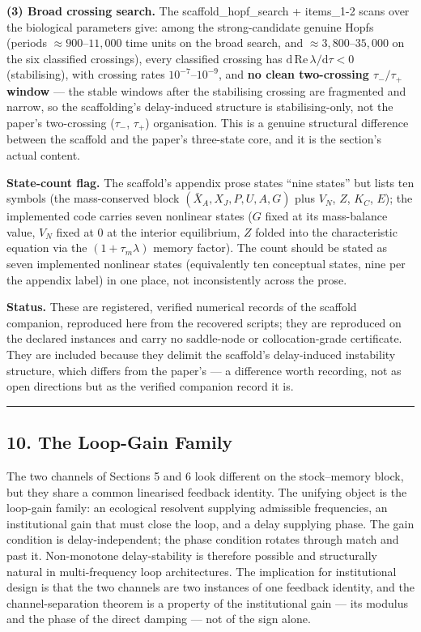 \documentclass[11pt]{article}
\begin{document}
\textbf{(3) Broad crossing search.} The scaffold\_hopf\_search +
items\_1-2 scans over the biological parameters give: among the
strong-candidate genuine Hopfs (periods \(\approx 900\)--\(11{,}000\)
time units on the broad search, and \(\approx 3{,}800\)--\(35{,}000\) on
the six classified crossings), every classified crossing has
\(\mathrm{d\,Re}\,\lambda/\mathrm{d}\tau < 0\) (stabilising), with
crossing rates \(10^{-7}\)--\(10^{-9}\), and \textbf{no clean
two-crossing \(\tau_-/\tau_+\) window} --- the stable windows after the
stabilising crossing are fragmented and narrow, so the scaffolding's
delay-induced structure is stabilising-only, not the paper's
two-crossing (\(\tau_-\), \(\tau_+\)) organisation. This is a genuine
structural difference between the scaffold and the paper's three-state
core, and it is the section's actual content.

\textbf{State-count flag.} The scaffold's appendix prose states ``nine
states'' but lists ten symbols (the mass-conserved block
\((\bar X_A, X_J, P, U, A, G)\) plus \(V_N\), \(Z\), \(K_C\), \(E\));
the implemented code carries seven nonlinear states (\(G\) fixed at its
mass-balance value, \(V_N\) fixed at \(0\) at the interior equilibrium,
\(Z\) folded into the characteristic equation via the
\((1+\tau_m\lambda)\) memory factor). The count should be stated as
seven implemented nonlinear states (equivalently ten conceptual states,
nine per the appendix label) in one place, not inconsistently across the
prose.

\textbf{Status.} These are registered, verified numerical records of the
scaffold companion, reproduced here from the recovered scripts; they are
reproduced on the declared instances and carry no saddle-node or
collocation-grade certificate. They are included because they delimit
the scaffold's delay-induced instability structure, which differs from
the paper's --- a difference worth recording, not as open directions but
as the verified companion record it is.

\begin{center}\rule{0.5\linewidth}{0.5pt}\end{center}

\subsection{10. The Loop-Gain Family}\label{the-loop-gain-family}

The two channels of Sections 5 and 6 look different on the stock--memory
block, but they share a common linearised feedback identity. The
unifying object is the loop-gain family: an ecological resolvent
supplying admissible frequencies, an institutional gain that must close
the loop, and a delay supplying phase. The gain condition is
delay-independent; the phase condition rotates through match and past
it. Non-monotone delay-stability is therefore possible and structurally
natural in multi-frequency loop architectures. The implication for
institutional design is that the two channels are two instances of one
feedback identity, and the channel-separation theorem is a property of
the institutional gain --- its modulus and the phase of the direct
damping --- not of the sign alone.
\end{document}
